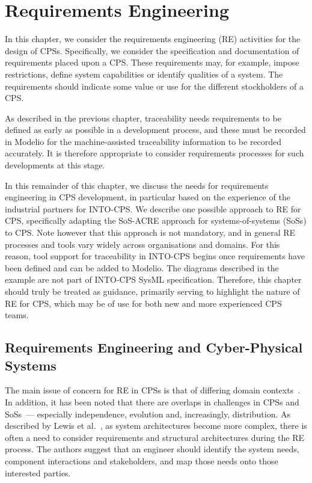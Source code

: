 \chapter{Requirements Engineering}
\label{sec:reqeng}

In this chapter, we consider the requirements engineering (RE) activities for the design of CPSs. Specifically, we consider the specification and documentation of requirements placed upon a CPS. These requirements may, for example, impose restrictions, define system capabilities or identify qualities of a system. The requirements should indicate some value or use for the different stockholders of a CPS.

As described in the previous chapter, traceability needs requirements to be defined as early as possible in a development process, and these must be recorded in Modelio for the machine-assisted traceability information to be recorded accurately. It is therefore appropriate to consider requirements processes for such developments at this stage.

In this remainder of this chapter, we discuss the needs for requirements engineering in CPS development, in particular based on the experience of the industrial partners for INTO-CPS. We describe one possible approach to RE for CPS, specifically adapting the SoS-ACRE approach for systems-of-systems (SoSs) to CPS. Note however that this approach is not mandatory, and in general RE processes and tools vary widely across organisations and domains. For this reason, tool support for traceability in INTO-CPS begins once requirements have been defined and can be added to Modelio. The diagrams described in the example are not part of INTO-CPS SysML specification. Therefore, this chapter should truly be treated as guidance, primarily serving to highlight the nature of RE for CPS, which may be of use for both new and more experienced CPS teams.


\section{Requirements Engineering and Cyber-Physical Systems}

The main issue of concern for RE in CPSs is that of differing domain contexts~\cite{Wiesner&14}. In addition, it has been noted that there are overlaps in challenges in CPSs and SoSs~\cite{Penzenstadler&12}--- especially independence, evolution and, increasingly, distribution. As described by Lewis et al.~\cite{Lewis&09}, as system architectures become more complex, there is often a need to consider requirements and structural architectures during the RE process. The authors suggest that an engineer should identify the system needs, component interactions and stakeholders, and map those needs onto those interested parties. %

